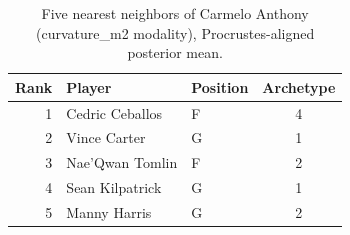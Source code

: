 \begin{table}[htbp]
  \centering\small
  \begin{tabular}{rllc}
    \toprule
    Rank & Player & Position & Archetype \\
    \midrule
    1 & Cedric Ceballos & F & 4 \\
    2 & Vince Carter & G & 1 \\
    3 & Nae'Qwan Tomlin & F & 2 \\
    4 & Sean Kilpatrick & G & 1 \\
    5 & Manny Harris & G & 2 \\
    \bottomrule
  \end{tabular}
  \caption{Five nearest neighbors of Carmelo Anthony (curvature_m2 modality), Procrustes-aligned posterior mean.}
  \label{tab:Carmelo_Anthony_neighbors_curvature_m2}
\end{table}

